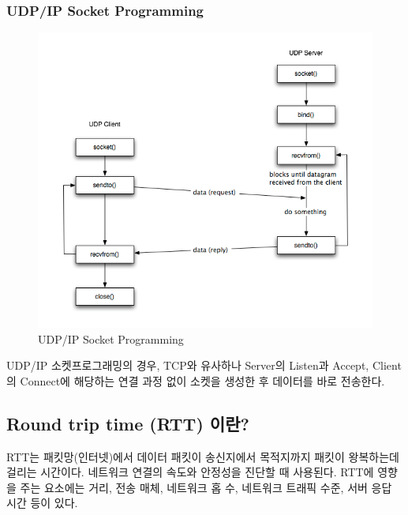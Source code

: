 \begin{multicols}{2}
    \subsubsection*{UDP/IP Socket Programming}
    \vspace{-4mm}
    \begin{figure}[!h]\centering
		\includegraphics[width=.65\textwidth]{image/week07/1-4.png}
		\caption{\small UDP/IP Socket Programming}
		\vspace{-10pt}
    \end{figure}
    UDP/IP 소켓프로그래밍의 경우, TCP와 유사하나 Server의 Listen과 Accept, Client의 Connect에 해당하는 연결 과정 없이 소켓을 생성한 후 데이터를 바로 전송한다.
    
\subsection{Round trip time (RTT) 이란?}    
    RTT는 패킷망(인터넷)에서 데이터 패킷이 송신지에서 목적지까지 패킷이 왕복하는데 걸리는 시간이다. 네트워크 연결의 속도와 안정성을 진단할 때 사용된다. RTT에 영향을 주는 요소에는 거리, 전송 매체, 네트워크 홉 수, 네트워크 트래픽 수준, 서버 응답 시간 등이 있다.
\end{multicols}
